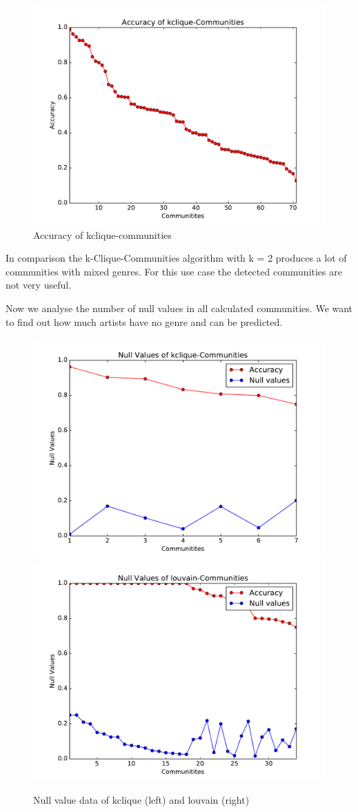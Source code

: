\documentclass[11pt,a4paper,onecolumn,notitlepage]{article}
\begin{document}
\begin{figure}[H]
\centering
\includegraphics[scale=0.4]{spotify_acc_kclique.pdf}
\caption{Accuracy of kclique-communities}
\end{figure}

In comparison the k-Clique-Communities algorithm with k = 2 produces a lot of communities with mixed genres. For this use case the detected communities are not very useful.

Now we analyse the number of null values in all calculated communities. We want to find out how much artists have no genre and can be predicted.

\begin{figure}[H]
\centering
\includegraphics[width=0.49\linewidth]{spotify_null_kclique.pdf}
\includegraphics[width=0.49\linewidth]{spotify_null_louvain.pdf}
\caption{Null value data of kclique (left) and louvain (right)}
\label{fig:nullvalues}
\end{figure}
\end{document}
